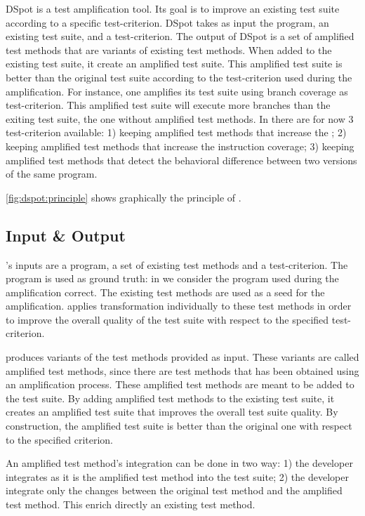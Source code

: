 DSpot is a test amplification tool.
Its goal is to improve an existing test suite according to a specific test-criterion.
DSpot takes as input the program, an existing test suite, and a test-criterion. 
The output of DSpot is a set of amplified test methods that are variants of existing test methods.
When added to the existing test suite, it create an amplified test suite.
This amplified test suite is better than the original test suite according to the test-criterion used during the amplification.
For instance, one amplifies its test suite using branch coverage as test-criterion.
This amplified test suite will execute more branches than the exiting test suite, \ie the one without amplified test methods.
In \dspot there are for now 3 test-criterion available:
1) keeping amplified test methods that increase the \ms;
2) keeping amplified test methods that increase the instruction coverage;
3) keeping amplified test methods that detect the behavioral difference between two versions of the same program.

\autoref{fig:dspot:principle} shows graphically the principle of \dspot.

\subsection{Input \& Output}
\label{subsec:dspot:overview:input-and-output}

\dspot's inputs are a program, a set of existing test methods and a test-criterion.
The program is used as ground truth: in \dspot we consider the program used during the amplification correct.
The existing test methods are used as a seed for the amplification.
\dspot applies transformation individually to these test methods in order to improve the overall quality of the test suite with respect to the specified test-criterion.

\dspot produces variants of the test methods provided as input.
These variants are called amplified test methods, since there are test methods that has been obtained using an amplification process.
These amplified test methods are meant to be added to the test suite.
By adding amplified test methods to the existing test suite, it creates an amplified test suite that improves the overall test suite quality.
By construction, the amplified test suite is better than the original one with respect to the specified criterion.

An amplified test method's integration can be done in two way:
1) the developer integrates as it is the amplified test method into the test suite;
2) the developer integrate only the changes between the original test method and the amplified test method.
This enrich directly an existing test method.

